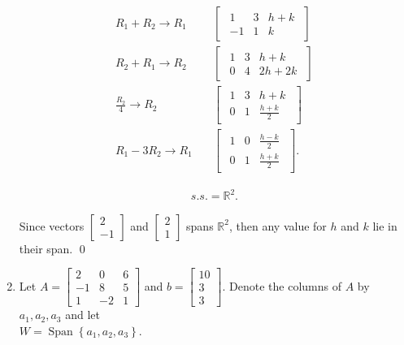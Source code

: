 \documentclass{zc-ust-hw}
\begin{document}
\begin{enumerate}
        \begin{align}
          R_1+R_2\rightarrow R_1
        & \quad
        \begin{bmatrix} 
          \begin{array}{cc|c}
            1 & 3 & h+k \\
            -1 & 1 & k
          \end{array}
        \end{bmatrix} \\
        R_2+R_1\rightarrow R_2
        & \quad
        \begin{bmatrix} 
          \begin{array}{cc|c}
            1 & 3 & h+k \\
            0 & 4 & 2h+2k
          \end{array}
        \end{bmatrix} \\
        \frac{ R_2 }{4}\rightarrow R_2
        & \quad
        \begin{bmatrix} 
          \begin{array}{cc|c}
            1 & 3 & h+k \\
            0 & 1 & \frac{h+k}{2}
          \end{array}
        \end{bmatrix} \\
        R_1-3R_2\rightarrow R_1
        & \quad
        \begin{bmatrix} 
          \begin{array}{cc|c}
            1 & 0 & \frac{h-k}{2} \\
            0 & 1 & \frac{h+k}{2}
          \end{array}
        \end{bmatrix}
      .\end{align}

      \begin{align}
        s.s. = \mathbb{R}^2
      .\end{align}

      Since vectors $\begin{bmatrix} 2\\-1 \end{bmatrix} $ and $\begin{bmatrix} 2\\1 \end{bmatrix} $ spans $\mathbb{R}^2$, then any value for $h$ and $k$ lie in their span. \qed

    \item Let ${A}=\left[\begin{array}{ccc}2 & 0 & 6 \\ -1 & 8 & 5
      \\ 1 & -2 & 1\end{array}\right]$ and
      ${b}=\left[\begin{array}{c}10 \\ 3 \\ 3\end{array}\right]$.
      Denote the columns of ${A}$ by ${a}_1, {a}_2,
      {a}_3$ and let\\
      ${W}=\operatorname{Span}\left\{{a}_1, {a}_2, {a}_3\right\}$.


\end{enumerate}
\end{document}

